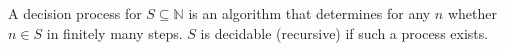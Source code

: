 A decision process for $S \subseteq \mathbb{N}$ is an algorithm that determines for any $n$ whether $n \in S$ in finitely many steps. $S$ is decidable (recursive) if such a process exists.
